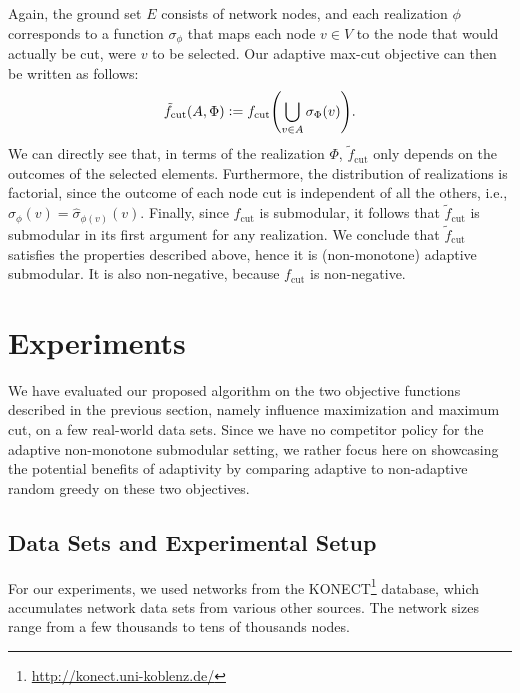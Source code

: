 \documentclass{article}
\newcommand{\defeq}{\vcentcolon=}
\let\originalleft\left
\let\originalright\right
\renewcommand{\left}{\mathopen{}\mathclose\bgroup\originalleft}
\renewcommand{\right}{\aftergroup\egroup\originalright}
\begin{document}
Again, the ground set $E$ consists of network nodes, and each realization $\phi$ corresponds to a function $\sigma_{\phi}$ that maps each node $v \in V$ to the node that would actually be cut, were $v$ to be selected.
Our adaptive max-cut objective can then be written as follows:
\begin{align*}
  \tilde{f}_{\textrm{cut}}(A, \Phi) \defeq f_{\textrm{cut}}\left(\bigcup_{v \in A}\sigma_{\Phi}(v)\right).
\end{align*}
We can directly see that, in terms of the realization $\Phi$, $\tilde{f}_{\textrm{cut}}$ only depends on the outcomes of the selected elements.
Furthermore, the distribution of realizations is factorial, since the outcome of each node cut is independent of all the others, i.e., $\sigma_{\phi}(v) = \hat{\sigma}_{\phi(v)}(v)$.
Finally, since $f_{\textrm{cut}}$ is submodular, it follows that $\tilde{f}_{\textrm{cut}}$ is submodular in its first argument for any realization.
We conclude that $\tilde{f}_{\textrm{cut}}$ satisfies the properties described above, hence it is (non-monotone) adaptive submodular.
It is also non-negative, because $f_{\textrm{cut}}$ is non-negative.

\section{Experiments}
We have evaluated our proposed algorithm on the two objective functions described in the previous section, namely influence maximization and maximum cut, on a few real-world data sets.
Since we have no competitor policy for the adaptive non-monotone submodular setting, we rather focus here on showcasing the potential benefits of adaptivity by comparing adaptive to non-adaptive random greedy on these two objectives.

\subsection{Data Sets and Experimental Setup}
For our experiments, we used networks from the KONECT\footnote{\url{http://konect.uni-koblenz.de/}} database, which accumulates network data sets from various other sources.
The network sizes range from a few thousands to tens of thousands nodes.
\end{document}
